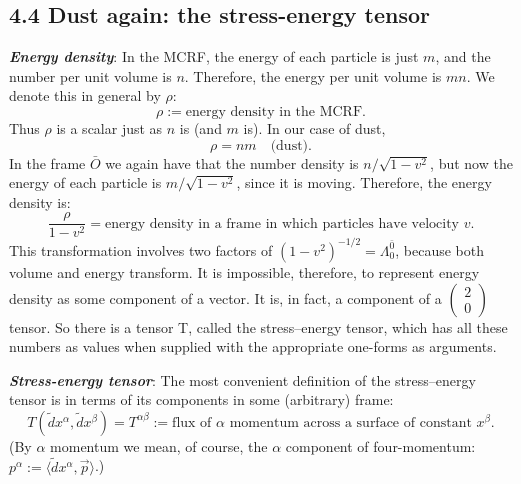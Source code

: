 \documentclass[12pt]{book}
\begin{document}
    \subsection{4.4 Dust again: the stress-energy tensor}

    \textit{\textbf{Energy density}}:
    In the MCRF, the energy of each particle is just \(m\), and the number per unit volume is \(n\). Therefore, the energy per unit volume is \(mn\). We denote this in general by \(\rho\):
    \[
    \rho := \text{energy density in the MCRF}. \tag{4.11}
    \]
    Thus \(\rho\) is a scalar just as \(n\) is (and \(m\) is). In our case of dust,
    \[
    \rho = nm \quad \text{(dust)}. \tag{4.12}
    \]
    In the frame \(\bar{O}\) we again have that the number density is \(n / \sqrt{1 - v^2}\), but now the energy of each particle is \(m / \sqrt{1 - v^2}\), since it is moving. Therefore, the energy density is:
    \[
    \frac{\rho}{1 - v^2} = \text{energy density in a frame in which particles have velocity } v. \tag{4.13}
    \]
    This transformation involves two factors of \((1 - v^2)^{-1/2} = \Lambda^\bar{0} _0\), because both volume and energy transform. It is impossible, therefore, to represent energy density as some component of a vector. It is, in fact, a component of a \( \begin{pmatrix} 2 \\ 0 \end{pmatrix} \) tensor. So there is a tensor T, called the stress–energy tensor, which has all these numbers as values when supplied with the appropriate one-forms as arguments.
    
    \textit{\textbf{Stress-energy tensor}}:
    The most convenient definition of the stress–energy tensor is in terms of its components in some (arbitrary) frame:
    \[
    T(\tilde{d}x^\alpha, \tilde{d}x^\beta) = T^{\alpha\beta} := \text{flux of \(\alpha\) momentum across a surface of constant \(x^\beta\)}. \tag{4.14}
    \]
    (By \(\alpha\) momentum we mean, of course, the \(\alpha\) component of four-momentum: \(p^\alpha := \langle \tilde{d}x^\alpha, \vec{p} \rangle\).)
\end{document}
